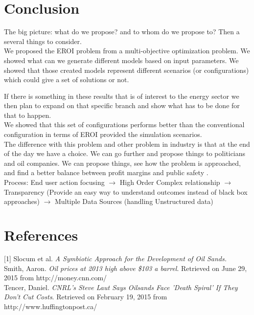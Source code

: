 \documentclass[12pt]{article}
\begin{document}
\section{Conclusion}
The big picture: what do we propose? and to whom do we propose to? Then a several things to consider. \\

We proposed the EROI problem from a multi-objective optimization problem. We showed what can we generate different models based on input parameters. We showed that those created models represent different scenarios (or configurations) which could give a set of solutions or not. 

If there is something in these results that is of interest to the energy sector we then plan to expand on that specific branch and show what has to be done for that to happen.\\  

We showed that this set of configurations performs better than the conventional configuration in terms of EROI provided the simulation scenarios. \\

The difference with this problem and other problem in industry is that at the end of the day we have a choice. We can go further and propose things to politicians and oil companies. We can propose things, see how the problem is approached,  and find a better balance between profit margins and public safety . \\

Process:
End user action focusing $\rightarrow$ High Order Complex relationship $\rightarrow$
Transparency (Provide an easy way to understand outcomes  instead of black box approaches) $\rightarrow$ Multiple Data Sources (handling Unstructured data) 

\newpage

\section{References}

[1] Slocum et al. \emph{A Symbiotic Approach for the Development of Oil Sands.} \\

\noindent [2] Smith, Aaron. \emph{Oil prices at 2013 high above \$103 a barrel}. Retrieved on June 29, 2015 from http://money.cnn.com/ \\

\noindent [3] Tencer, Daniel. \emph{CNRL's Steve Laut Says Oilsands Face 'Death Spiral' If They Don't Cut Costs}. Retrieved on February 19, 2015 from http://www.huffingtonpost.ca/
\end{document}
